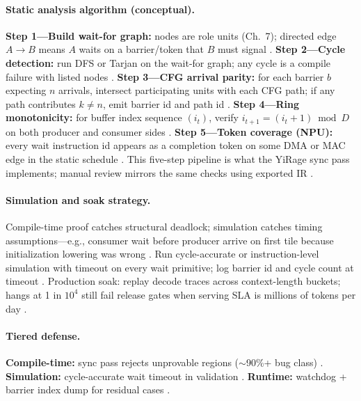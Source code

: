 \paragraph{Static analysis algorithm (conceptual).}
\textbf{Step 1---Build wait-for graph:} nodes are role units (Ch.~7); directed edge $A \rightarrow B$ means $A$ waits on a barrier/token that $B$ must signal \citep{yirage2026,wu2024mirage}.
\textbf{Step 2---Cycle detection:} run DFS or Tarjan on the wait-for graph; any cycle is a compile failure with listed nodes \citep{chen2020compilerbasedhardw,mpk2025}.
\textbf{Step 3---CFG arrival parity:} for each barrier $b$ expecting $n$ arrivals, intersect participating units with each CFG path; if any path contributes $k \neq n$, emit barrier id and path id \citep{shah2024flashattention3,nvidia2022hopper}.
\textbf{Step 4---Ring monotonicity:} for buffer index sequence $(i_t)$, verify $i_{t+1} = (i_t + 1) \bmod D$ on both producer and consumer sides \citep{semianalysis2024tma,dao2022flashattention}.
\textbf{Step 5---Token coverage (NPU):} every wait instruction id appears as a completion token on some DMA or MAC edge in the static schedule \citep{amd2024xdna,amd2024aie}.
This five-step pipeline is what the YiRage sync pass implements; manual review mirrors the same checks using exported IR \citep{yirage2026,taxbreak2026}.

\paragraph{Simulation and soak strategy.}
Compile-time proof catches structural deadlock; simulation catches timing assumptions---e.g., consumer wait before producer arrive on first tile because initialization lowering was wrong \citep{shah2024flashattention3,patel2025llminference}.
Run cycle-accurate or instruction-level simulation with timeout on every wait primitive; log barrier id and cycle count at timeout \citep{nvidia2022hopper,semianalysis2024tma}.
Production soak: replay decode traces across context-length buckets; hangs at 1 in $10^4$ still fail release gates when serving SLA is millions of tokens per day \citep{taxbreak2026,mpk2025,kwon2023vllm}.

\paragraph{Tiered defense.}
\textbf{Compile-time:} sync pass rejects unprovable regions (${\sim}$90\%+ bug class) \citep{yirage2026,wu2024mirage,chen2020compilerbasedhardw}.
\textbf{Simulation:} cycle-accurate wait timeout in validation \citep{shah2024flashattention3,patel2025llminference}.
\textbf{Runtime:} watchdog + barrier index dump for residual cases \citep{taxbreak2026,mpk2025}.

